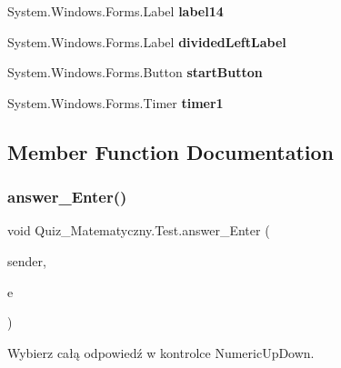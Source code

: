 \begin{DoxyCompactItemize}
System.\+Windows.\+Forms.\+Label {\bfseries label14}
\item 
\mbox{\label{class_quiz___matematyczny_1_1_test_a5ba5162f6f7c72a14cf4b07daf24cc5e}} 
System.\+Windows.\+Forms.\+Label {\bfseries divided\+Left\+Label}
\item 
\mbox{\label{class_quiz___matematyczny_1_1_test_a417d39c5e845b86c6e7889ae6d70b3e6}} 
System.\+Windows.\+Forms.\+Button {\bfseries start\+Button}
\item 
\mbox{\label{class_quiz___matematyczny_1_1_test_a7e6d42cc605e8f42e6731263fcfd37e5}} 
System.\+Windows.\+Forms.\+Timer {\bfseries timer1}
\end{DoxyCompactItemize}


\subsection{Member Function Documentation}
\mbox{\label{class_quiz___matematyczny_1_1_test_adb70fa037d9769b356262bf9f5494370}} 
\subsubsection{\texorpdfstring{answer\_Enter()}{answer\_Enter()}}
{\footnotesize\ttfamily void Quiz\+\_\+\+Matematyczny.\+Test.\+answer\+\_\+\+Enter (\begin{DoxyParamCaption}\item[{object}]{sender,  }\item[{Event\+Args}]{e }\end{DoxyParamCaption})\hspace{0.3cm}{\ttfamily [private]}}

Wybierz całą odpowiedź w kontrolce Numeric\+Up\+Down. \mbox{\label{class_quiz___matematyczny_1_1_test_ae19f992c94f6effaaecf8a015e5d92be}} 
